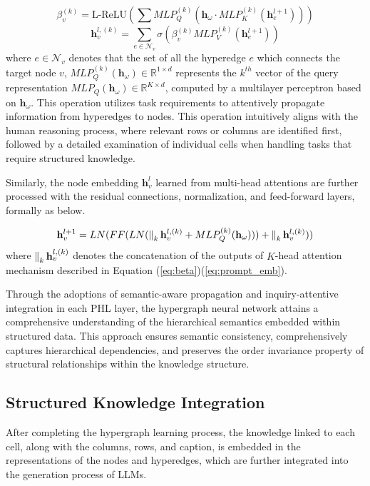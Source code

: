 {\begin{equation}
    \beta_v^{(k)} = \text{L-ReLU}(\sum MLP_Q^{(k)}(\mathbf{h}_{\omega}\cdot MLP_K^{(k)}(\mathbf{h}_e^{l+1})))
\label{eq:beta}    
\end{equation}
\begin{equation}
    \mathbf{h}_v^{l,(k)} = \sum_{e\in\mathcal{N}_v} \sigma(\beta_v^{(k)}MLP_V^{(k)}(\mathbf{h}_e^{l+1}))
\label{eq:prompt_emb}
\end{equation}
where $e\in\mathcal{N}_v$ denotes that the set of all the hyperedge $e$ which connects the target node $v$, $MLP_Q^{(k)}(\mathbf{h}_{\omega})\in\mathbb{R}^{1\times d}$ represents the $k^{th}$ vector of the query representation $MLP_Q(\mathbf{h}_{\omega})\in\mathbb{R}^{K\times d}$, computed by a multilayer perceptron based on $\mathbf{h}_{\omega}$. This operation utilizes task requirements to attentively propagate information from hyperedges to nodes. This operation intuitively aligns with the human reasoning process, where relevant rows or columns are identified first, followed by a detailed examination of individual cells when handling tasks that require structured knowledge.

Similarly, the node embedding $\mathbf{h}_v^{l}$ learned from multi-head attentions are further processed with the residual connections, normalization, and feed-forward layers, formally as below.

\begin{equation}
    \mathbf{h}_v^{l+1} = LN(FF(LN(\operatorname*{\Vert}\nolimits_k\mathbf{h}_v^{l,(k)}+MLP_Q^{(k)}(\mathbf{h}_{\omega})))+\operatorname*{\Vert}\nolimits_k\mathbf{h}_v^{l,(k)}))
\end{equation}
where $\operatorname*{\Vert}\nolimits_k\mathbf{h}_v^{l,(k)}$ denotes the concatenation of the outputs of $K$-head attention mechanism described in Equation (\ref{eq:beta})(\ref{eq:prompt_emb}). 

Through the adoptions of semantic-aware propagation and inquiry-attentive integration in each PHL layer, the hypergraph neural network attains a comprehensive understanding of the hierarchical semantics embedded within structured data. This approach ensures semantic consistency, comprehensively captures hierarchical dependencies, and preserves the order invariance property of structural relationships within the knowledge structure.

\subsection{Structured Knowledge Integration}
After completing the hypergraph learning process, the knowledge linked to each cell, along with the columns, rows, and caption, is embedded in the representations of the nodes and hyperedges, which are further integrated into the generation process of LLMs.

}

